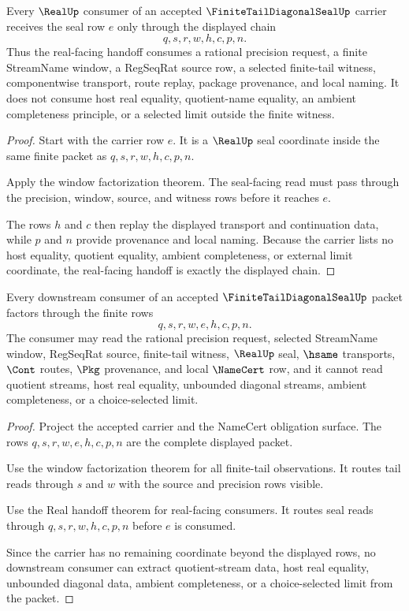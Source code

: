 \begin{theorem}
\label{thm:finite-tail-diagonal-seal-real-handoff}
Every $\RealUp$ consumer of an accepted $\FiniteTailDiagonalSealUp$ carrier receives the seal row $e$ only through the displayed chain
$$
q,s,r,w,h,c,p,n.
$$
Thus the real-facing handoff consumes a rational precision request, a finite StreamName window, a RegSeqRat source row, a selected finite-tail witness, componentwise transport, route replay, package provenance, and local naming. It does not consume host real equality, quotient-name equality, an ambient completeness principle, or a selected limit outside the finite witness.
\end{theorem}
\begin{proof}
Start with the carrier row $e$. It is a $\RealUp$ seal coordinate inside the same finite packet as $q,s,r,w,h,c,p,n$.

Apply the window factorization theorem. The seal-facing read must pass through the precision, window, source, and witness rows before it reaches $e$.

The rows $h$ and $c$ then replay the displayed transport and continuation data, while $p$ and $n$ provide provenance and local naming. Because the carrier lists no host equality, quotient equality, ambient completeness, or external limit coordinate, the real-facing handoff is exactly the displayed chain.
\end{proof}

\begin{theorem}
\label{thm:finite-tail-diagonal-seal-non-escape}
Every downstream consumer of an accepted $\FiniteTailDiagonalSealUp$ packet factors through the finite rows
$$
q,s,r,w,e,h,c,p,n.
$$
The consumer may read the rational precision request, selected StreamName window, RegSeqRat source, finite-tail witness, $\RealUp$ seal, $\hsame$ transports, $\Cont$ routes, $\Pkg$ provenance, and local $\NameCert$ row, and it cannot read quotient streams, host real equality, unbounded diagonal streams, ambient completeness, or a choice-selected limit.
\end{theorem}
\begin{proof}
Project the accepted carrier and the NameCert obligation surface. The rows $q,s,r,w,e,h,c,p,n$ are the complete displayed packet.

Use the window factorization theorem for all finite-tail observations. It routes tail reads through $s$ and $w$ with the source and precision rows visible.

Use the Real handoff theorem for real-facing consumers. It routes seal reads through $q,s,r,w,h,c,p,n$ before $e$ is consumed.

Since the carrier has no remaining coordinate beyond the displayed rows, no downstream consumer can extract quotient-stream data, host real equality, unbounded diagonal data, ambient completeness, or a choice-selected limit from the packet.
\end{proof}

